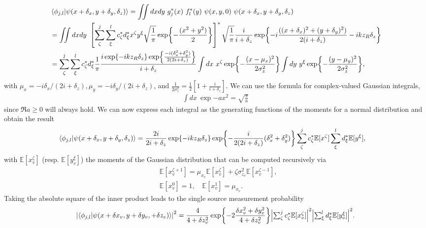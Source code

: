 \documentclass[reprint,amsmath,amssymb,aps,prl,floatfix,groupedaddress,superscriptaddress]{revtex4-2}
\begin{document}
\begin{align}
    &\braket{\phi_{j,l}}{\psi(x+\delta_x,y+\delta_y,\delta_z)} = \iint dxdy \  g^*_j(x) \ f^*_l(y) \ \psi(x,y,0) \ \psi(x+\delta_x,y+\delta_y,\delta_z) \nonumber \\
     &= \iint dxdy \ \left [  \sum_\zeta^j \sum_\xi^l c^*_\zeta d^*_\xi x^\zeta y^\xi \sqrt{\frac{1}{\pi}} \exp{-\frac{(x^2 + y^2)}{2}} \right ]^* \sqrt{\frac{1}{\pi}} \frac{i}{i + \delta_z}\exp{-i\frac{((x+\delta_x)^2 + (y+\delta_y)^2)}{2(i+\delta_z)} - i k z_R \delta_z} \nonumber \\
     &= \sum_\zeta^j  \sum_\xi^l c_\zeta^*  d_\xi^* \frac{1}{\pi} \frac{i \exp{-ikz_R \delta_z} \exp{\frac{-i( \delta_x^2 + \delta_y^2)}{2(2i+\delta_z)}}}{i+\delta_z} \int dx \ x^\zeta \exp{-\frac{(x - \mu_x)^2}{2\sigma_z^2}} \int dy \ y^\xi \exp{-\frac{(y - \mu_y)^2}{2\sigma_z^2}},
\end{align}
with $\mu_x = -i\delta_x / (2i + \delta_z), \mu_y = -i\delta_y / (2i + \delta_z)$, and $\frac{1}{2\sigma_z^2} = \frac{1}{2} [ 1 + \frac{i}{i + \delta_z}]$. We can use the formula for complex-valued Gaussian integrals,
\begin{align}
    \int dx \ \exp{-ax^2} = \sqrt{\frac{\pi}{a}}
\end{align}
since $\Re{a} \geq 0$ will always hold. We can now express each integral as the generating functions of the moments for a normal distribution and obtain the result
\begin{align}
   \braket{\phi_{j,l}}{\psi(x+\delta_x,y+\delta_y,\delta_z)} &= \frac{2i}{2i + \delta_z}  \exp{-ikz_R\delta_z} \exp{-\frac{i}{2(2i +\delta_z)}(\delta_x^2 + \delta_y^2)} \sum_\zeta^j c^*_\zeta \mathbb{E}[x^\zeta]\sum_\xi^l d^*_\xi \mathbb{E}[y^\xi],
\end{align}
with $\mathbb{E}[x_v^\zeta]$ (resp. $\mathbb{E}[y_v^\xi]$) the moments of the Gaussian distribution that can be computed recursively via
\begin{align}
    \label{def:recursive_moments}
    &\mathbb{E}[x_v^{\zeta+1}] = \mu_{x_v} \mathbb{E}[x_v^\zeta] + \zeta \sigma_{z_v}^2 \mathbb{E}[x_v^{\zeta-1}], \\
    &\mathbb{E}[x_v^0] = 1,  \quad \mathbb{E}[x_v^1] = \mu_{x_v} \nonumber.
\end{align}
Taking the absolute square of the inner product leads to the single source measurement probability
\begin{align}
\label{eq:three_sources_incoherent_ms_prob}
    \abs{\braket{\phi_{j,l}}{\psi(x + \delta x_v, y + \delta y_v, + \delta z_v)}}^2 = \frac{4}{4 + \delta z_v^2} \exp{-2 \frac{\delta x_v^2 + \delta y_v^2}{4+\delta z_v^2}} \mbox{$\abs{\sum_\zeta^j c^*_\zeta \mathbb{E}[x_v^\zeta]}^2$} \mbox{$\abs{\sum_\xi^l d^*_\xi \mathbb{E}[y_v^\xi]}^2$}.
\end{align}
\end{document}
